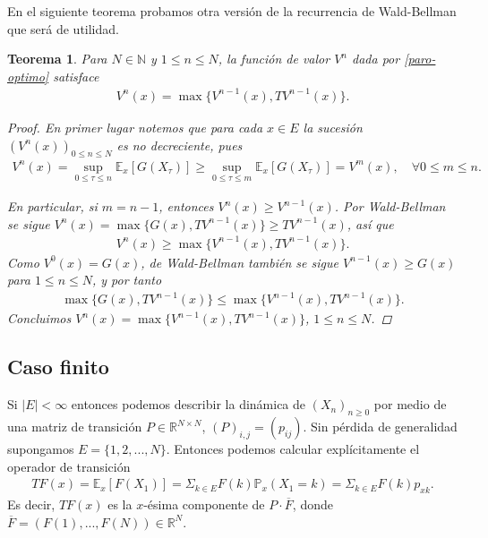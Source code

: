 \documentclass{article}
\newtheorem{teorema}[theorem]{Teorema}
\numberwithin{equation}{section}
\begin{document}
En el siguiente teorema probamos otra versión de la recurrencia de Wald-Bellman que será de utilidad.

\begin{teorema}\label{camargo}
    Para $N\in \mathbb{N}$ y $1\leq n\leq N$, la función de valor $V^n$ dada por \eqref{paro-optimo} satisface
    \begin{align}
        V^n(x) = \max\{V^{n-1}(x), TV^{n-1}(x)\}.
    \end{align}

    \begin{proof}
        En primer lugar notemos que para cada $x \in E$ la sucesión $(V^n(x))_{0\leq n\leq N}$ es no decreciente, pues
        \begin{align}
            V^n(x) = \sup_{0\leq \tau\leq n}\mathbb{E}_x\left[G(X_\tau)\right] \geq \sup_{0\leq \tau \leq m}\mathbb{E}_x\left[G(X_\tau)\right] = V^m(x), \quad \forall 0\leq m \leq n.
        \end{align}

        En particular, si $m=n-1$, entonces $V^n(x)\geq V^{n-1}(x)$. Por Wald-Bellman se sigue $V^n(x) = \max\{G(x),TV^{n-1}(x)\} \geq TV^{n-1}(x)$, así que
        \begin{align*}
        V^n(x) \geq \max\{V^{n-1}(x),TV^{n-1}(x)\}.
        \end{align*}
        Como $V^0(x) = G(x)$, de Wald-Bellman también se sigue $V^{n-1}(x)\geq G(x)$ para $1\leq n \leq N$, y por tanto 
        \begin{align*}
        \max\{G(x),TV^{n-1}(x)\}\leq \max\{V^{n-1}(x),TV^{n-1}(x)\}.
        \end{align*}
        Concluimos $V^n(x) = \max\{V^{n-1}(x),TV^{n-1}(x)\}$, $1\leq n \leq N$.
    \end{proof}
\end{teorema}

\subsection{Caso finito}

Si $|E|< \infty$ entonces podemos describir la dinámica de $(X_n)_{n\geq 0}$ por medio de una matriz de transición $P\in \mathbb{R}^{N\times N}$, $(P)_{i,j} = (p_{ij})$. Sin pérdida de generalidad supongamos $E = \{1,2,...,N\}$. Entonces podemos calcular explícitamente el operador de transición
\begin{align*}
    TF(x) = \mathbb{E}_x\left[F(X_1)\right] = \Sigma_{k \in E}F(k)\mathbb{P}_x(X_1 = k) = \Sigma_{k \in E}F(k)p_{xk}.
\end{align*}
Es decir, $TF(x)$ es la $x$-ésima componente de $P\cdot \overline{F}$, donde $\overline{F} = (F(1),...,F(N)) \in \mathbb{R}^N$.
\end{document}
